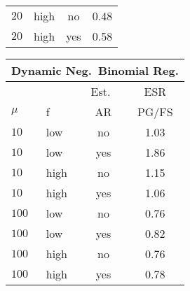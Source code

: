 \documentclass[12pt]{article}
\begin{document}
\begin{table}
\begin{center}
\begin{tabular}{l l c c}
      $20$ & high & no & 0.48 \\
      $20$ & high & yes & 0.58
    \end{tabular}
    \hspace{12pt}
    \begin{tabular}{l l c c}
      \multicolumn{4}{c}{Dynamic Neg.\ Binomial Reg.} \\
      \hline
      & & Est.\ & ESR \\
      $\mu$ & f & AR & PG/FS \\
      \hline
      $10$ & low & no & 1.03 \\
      $10$ & low & yes & 1.86 \\

      $10$ & high & no & 1.15 \\
      $10$ & high & yes & 1.06 \\

      $100$ & low & no & 0.76 \\
      $100$ & low & yes & 0.82 \\

      $100$ & high & no & 0.76 \\
      $100$ & high & yes & 0.78 \\

    \end{tabular}
  \end{center}


\end{table}
\end{document}
